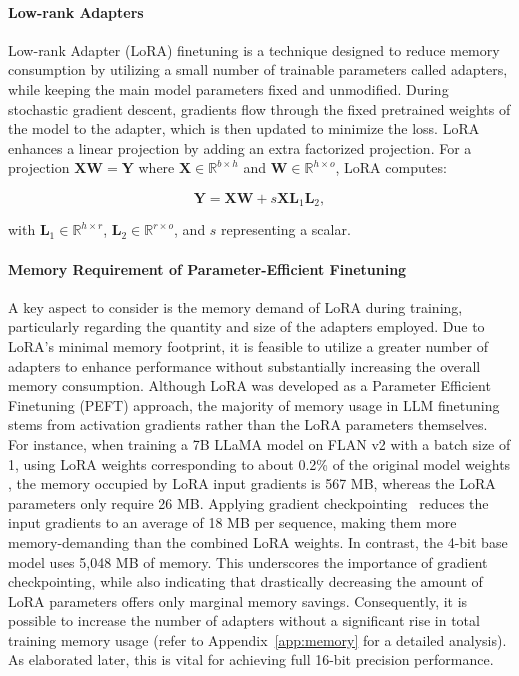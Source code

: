 \paragraph{Low-rank Adapters} Low-rank Adapter (LoRA) finetuning \citep{hu2021lora} is a technique designed to reduce memory consumption by utilizing a small number of trainable parameters called adapters, while keeping the main model parameters fixed and unmodified. During stochastic gradient descent, gradients flow through the fixed pretrained weights of the model to the adapter, which is then updated to minimize the loss. LoRA enhances a linear projection by adding an extra factorized projection. For a projection ${\mathbf{X} \mathbf{W} = \mathbf{Y}}$ where $\mathbf{X}\in \mathbb{R}^{b\times h}$ and $\mathbf{W}\in \mathbb{R}^{h\times o}$, LoRA computes:

\begin{equation}
    \mathbf{Y} = \mathbf{X}\mathbf{W} + s\mathbf{X}\mathbf{L}_1\mathbf{L}_2,
\end{equation}

with $\mathbf{L}_1\in \mathbb{R}^{h\times r}$, $\mathbf{L}_2\in \mathbb{R}^{r\times o}$, and $s$ representing a scalar.

\paragraph{Memory Requirement of Parameter-Efficient Finetuning} A key aspect to consider is the memory demand of LoRA during training, particularly regarding the quantity and size of the adapters employed. Due to LoRA's minimal memory footprint, it is feasible to utilize a greater number of adapters to enhance performance without substantially increasing the overall memory consumption. Although LoRA was developed as a Parameter Efficient Finetuning (PEFT) approach, the majority of memory usage in LLM finetuning stems from activation gradients rather than the LoRA parameters themselves. For instance, when training a 7B LLaMA model on FLAN v2 with a batch size of 1, using LoRA weights corresponding to about 0.2\% of the original model weights \citep{hu2021lora,liu2022few}, the memory occupied by LoRA input gradients is 567 MB, whereas the LoRA parameters only require 26 MB. Applying gradient checkpointing~\citep{chen2016training} reduces the input gradients to an average of 18 MB per sequence, making them more memory-demanding than the combined LoRA weights. In contrast, the 4-bit base model uses 5,048 MB of memory. This underscores the importance of gradient checkpointing, while also indicating that drastically decreasing the amount of LoRA parameters offers only marginal memory savings. Consequently, it is possible to increase the number of adapters without a significant rise in total training memory usage (refer to Appendix~\ref{app:memory} for a detailed analysis). As elaborated later, this is vital for achieving full 16-bit precision performance.

